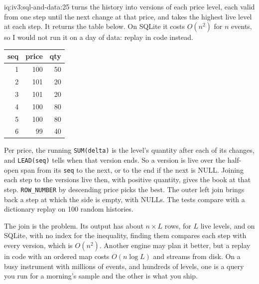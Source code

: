 \begin{solution}{iq:iv3:sql-and-data:25}
 turns the history into versions of each price level, each valid from one step until the next change at that price, and takes the highest live level at each step. It returns the table below. On SQLite it costs $O(n^2)$ for $n$ events, so I would not run it on a day of data: replay in code instead.
\enlargethispage{-3\baselineskip}%
\label{lst:iv3:sq:best}
\begin{center}\small
\begin{tabular}{rrr}
seq & price & qty\\\hline
1 & 100 & 50\\
2 & 101 & 20\\
3 & 101 & 20\\
4 & 100 & 80\\
5 & 100 & 80\\
6 & 99 & 40
\end{tabular}
\end{center}
Per price, the running \texttt{SUM(delta)} is the level's quantity after each of its changes, and \texttt{LEAD(seq)} tells when that version ends. So a version is live over the half-open span from its \texttt{seq} to the next, or to the end if the next is NULL. Joining each step to the versions live then, with positive quantity, gives the book at that step. \texttt{ROW\_NUMBER} by descending price picks the best. The outer left join brings back a step at which the side is empty, with NULLs. The tests compare with a dictionary replay on 100 random histories.

The join is the problem. Its output has about $n \times L$ rows, for $L$ live levels, and on SQLite, with no index for the inequality, finding them compares each step with every version, which is $O(n^2)$. Another engine may plan it better, but a replay in code with an ordered map costs $O(n \log L)$ and streams from disk. On a busy instrument with millions of events, and hundreds of levels, one is a query you run for a morning's sample and the other is what you ship.

\end{solution}
